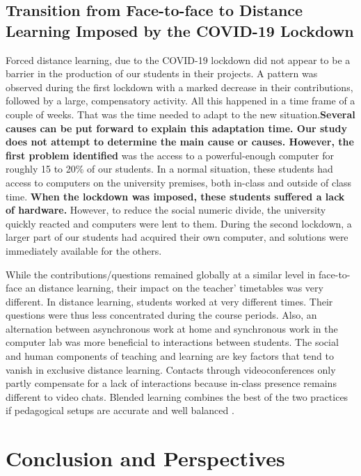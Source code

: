 \documentclass{aims}
\theoremstyle{definition}
\begin{document}
\hypertarget{transition-from-face-to-face-to-distance-learning-imposed-by-the-covid-19-lockdown-2}{%
\subsection{Transition from Face-to-face to Distance Learning Imposed by
the COVID-19
Lockdown}\label{transition-from-face-to-face-to-distance-learning-imposed-by-the-covid-19-lockdown-2}}

Forced distance learning, due to the COVID-19 lockdown did not appear to
be a barrier in the production of our students in their projects. A
pattern was observed during the first lockdown with a marked decrease in
their contributions, followed by a large, compensatory activity. All
this happened in a time frame of a couple of weeks. That was the time
needed to adapt to the new situation.\textbf{Several causes can be put
forward to explain this adaptation time. Our study does not attempt to
determine the main cause or causes. However, the first problem
identified} was the access to a powerful-enough computer for roughly 15
to 20\% of our students. In a normal situation, these students had
access to computers on the university premises, both in-class and
outside of class time. \textbf{When the lockdown was imposed, these
students suffered a lack of hardware.} However, to reduce the social
numeric divide, the university quickly reacted and computers were lent
to them. During the second lockdown, a larger part of our students had
acquired their own computer, and solutions were immediately available
for the others.

While the contributions/questions remained globally at a similar level
in face-to-face an distance learning, their impact on the teacher'
timetables was very different. In distance learning, students worked at
very different times. Their questions were thus less concentrated during
the course periods. Also, an alternation between asynchronous work at
home and synchronous work in the computer lab was more beneficial to
interactions between students. The social and human components of
teaching and learning are key factors that tend to vanish in exclusive
distance learning. Contacts through videoconferences only partly
compensate for a lack of interactions because in-class presence remains
different to video chats. Blended learning combines the best of the two
practices if pedagogical setups are accurate and well balanced
\cite{Bernard2014}.

\hypertarget{conclusion-and-perspectives}{%
\section{Conclusion and
Perspectives}\label{conclusion-and-perspectives}}
\end{document}
